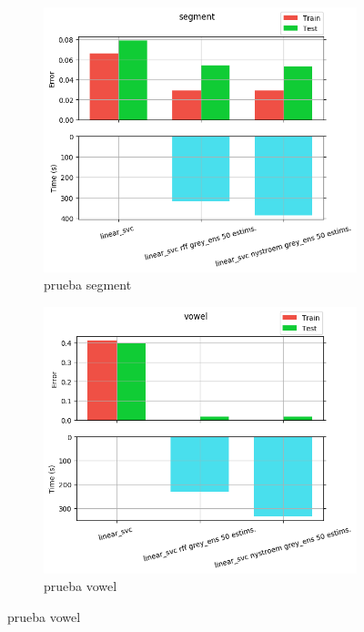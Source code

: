\begin{figure}[ht]
  \centering
  \begin{subfigure}[b]{0.5\linewidth}
    \centering\includegraphics[width=\imgscale\linewidth]{Figures/2_8/segment}
    \caption{prueba segment}
    \label{fig:2_8_segment}
  \end{subfigure}%
  \begin{subfigure}[b]{0.5\linewidth}
    \centering\includegraphics[width=\imgscale\linewidth]{Figures/2_8/vowel}
    \caption{prueba vowel}
    \label{fig:2_8_vowel}
  \end{subfigure}
\end{figure}
